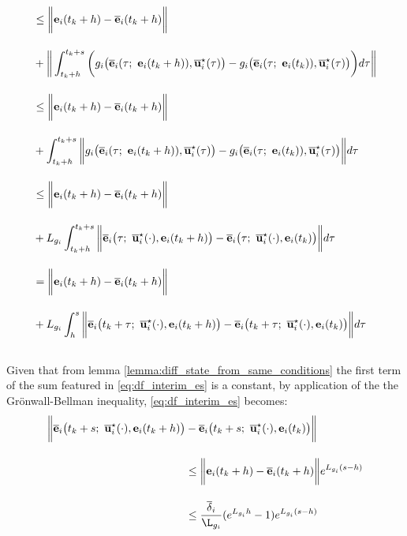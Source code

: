 \begin{gg_box}
\begin{align}
    &\leq \bigg\| \vect{e}_i(t_k +h) - \overline{\vect{e}}_i(t_k + h) \bigg \| \\[2.5ex]
    &+ \bigg\| \int_{t_k +h}^{t_k + s} \bigg( g_i\big(\overline{\vect{e}}_i(\tau;\ \vect{e}_i(t_k + h)), \overline{\vect{u}}_i^{\star}(\tau)\big)
    -  g_i\big(\overline{\vect{e}}_i(\tau;\ \vect{e}_i(t_k)), \overline{\vect{u}}_i^{\star}(\tau)\big) \bigg) d\tau \bigg\| \\[2.5ex]
    &\leq \bigg\| \vect{e}_i(t_k +h) - \overline{\vect{e}}_i(t_k + h) \bigg \| \\[2.5ex]
    &+ \int_{t_k +h}^{t_k + s} \bigg\| g_i\big(\overline{\vect{e}}_i(\tau;\ \vect{e}_i(t_k + h)), \overline{\vect{u}}_i^{\star}(\tau)\big)
    -  g_i\big(\overline{\vect{e}}_i(\tau;\ \vect{e}_i(t_k)), \overline{\vect{u}}_i^{\star}(\tau)\big) \bigg\| d\tau \\[2.5ex]
    &\leq \bigg\| \vect{e}_i(t_k +h) - \overline{\vect{e}}_i(t_k + h) \bigg \| \\[2.5ex]
    &+ L_{g_i} \int_{t_k +h}^{t_k + s} \bigg\| \overline{\vect{e}}_i\big(\tau;\ \overline{\vect{u}}_i^{\star}(\cdot), \vect{e}_i(t_k + h) \big)
    -  \overline{\vect{e}}_i\big(\tau;\ \overline{\vect{u}}_i^{\star}(\cdot), \vect{e}_i(t_k)\big) \bigg\| d\tau \\[2.5ex]
    &= \bigg\| \vect{e}_i(t_k +h) - \overline{\vect{e}}_i(t_k + h) \bigg \| \\[2.5ex]
    &+ L_{g_i} \int_{h}^{s} \bigg\| \overline{\vect{e}}_i\big(t_k + \tau;\ \overline{\vect{u}}_i^{\star}(\cdot), \vect{e}_i(t_k + h) \big)
    -  \overline{\vect{e}}_i\big(t_k + \tau;\ \overline{\vect{u}}_i^{\star}(\cdot), \vect{e}_i(t_k)\big) \bigg\| d\tau \\[2.5ex]
    \label{eq:df_interim_es}
\end{align}

Given that from lemma \eqref{lemma:diff_state_from_same_conditions}
the first term of the sum featured in \eqref{eq:df_interim_es} is a constant,
by application of the the Gr\"{o}nwall-Bellman inequality,
\eqref{eq:df_interim_es} becomes:
\begin{align}
  \bigg \| \overline{\vect{e}}_i\big(t_k + s;\ \overline{\vect{u}}_i^{\star}(\cdot), \vect{e}_i(t_k +h)\big)
    &-\overline{\vect{e}}_i\big(t_k + s;\ \overline{\vect{u}}_i^{\star}(\cdot), \vect{e}_i(t_k)\big) \bigg \| \\[2.5ex]
    &\leq \bigg\| \vect{e}_i(t_k +h) - \overline{\vect{e}}_i(t_k + h) \bigg \| e^{L_{g_i}(s-h)} \\[2.5ex]
    &\leq \dfrac{\overline{\delta}_i}{\L_{g_i}} (e^{L_{g_i}h} - 1) e^{L_{g_i}(s-h)}
\end{align}
\end{gg_box}

